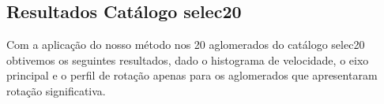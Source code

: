 %
%

\begin{apendicesenv}
\partapendices

\chapter{Resultados Catálogo selec20}
\label{chap:apendiceselec20}
Com a aplicação do nosso método nos 20 aglomerados do catálogo selec20 obtivemos os seguintes resultados, dado o histograma de velocidade, o eixo principal e o perfil de rotação apenas para os aglomerados que apresentaram rotação significativa.  

\begin{figure}[H] %
\vspace{-2pt}
\centering
{}

\end{figure}
\end{apendicesenv}

